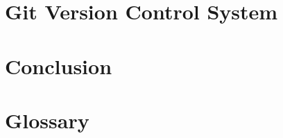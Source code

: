 \documentclass[12pt, a4paper, oneside]{article}
\begin{document}
	\section{Git Version Control System}
		
	\section{Conclusion}
	
	\newpage
	
	\newpage
	\appendix
	
	\section{Glossary}
	
\end{document}
